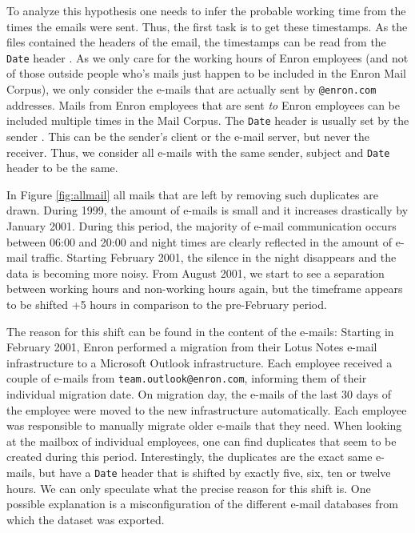 \documentclass{article}
\begin{document}
To analyze this hypothesis one needs to infer the probable working time from the
times the emails were sent. Thus, the first task is to get these timestamps. As
the files contained the headers of the email, the timestamps can be read from
the \texttt{Date} header \citep{rfc5322}. As we only care for the working hours
of Enron employees (and not of those outside people who's mails just happen to
be included in the Enron Mail Corpus), we only consider the e-mails that are
actually sent by \texttt{@enron.com} addresses. Mails from Enron employees that
are sent \emph{to} Enron employees can be included multiple times in the Mail
Corpus. The \texttt{Date} header is usually set by the sender \citep{rfc2821}.
This can be the sender's client or the e-mail server, but never the receiver.
Thus, we consider all e-mails with the same sender, subject and \texttt{Date}
header to be the same.

In Figure \ref{fig:allmail} all mails that are left by removing such duplicates
are drawn. During 1999, the amount of e-mails is small and it increases
drastically by January 2001. During this period, the majority of e-mail
communication occurs between 06:00 and 20:00 and night times are clearly
reflected in the amount of e-mail traffic. Starting February 2001, the silence
in the night disappears and the data is becoming more noisy. From August 2001,
we start to see a separation between working hours and non-working hours again,
but the timeframe appears to be shifted +5 hours in comparison to the
pre-February period.

The reason for this shift can be found in the content of the e-mails: Starting
in February 2001, Enron performed a migration from their Lotus Notes e-mail
infrastructure to a Microsoft Outlook infrastructure. Each employee received a
couple of e-mails from \texttt{team.outlook@enron.com}, informing them of their
individual migration date. On migration day, the e-mails of the last 30 days of
the employee were moved to the new infrastructure automatically. Each employee
was responsible to manually migrate older e-mails that they need. When looking
at the mailbox of individual employees, one can find duplicates that seem to be
created during this period. Interestingly, the duplicates are the exact same
e-mails, but have a \texttt{Date} header that is shifted by exactly five, six,
ten or twelve hours. We can only speculate what the precise reason for this
shift is. One possible explanation is a misconfiguration of the different e-mail
databases from which the dataset was exported.
\end{document}
